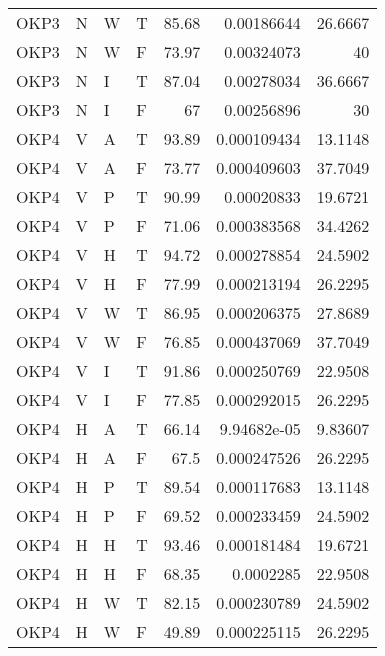 \begin{longtable}{llllrrr}
    OKP3     & N     & W     & T          & 85.68      & 0.00186644  & 26.6667  \\
    OKP3     & N     & W     & F          & 73.97      & 0.00324073  & 40       \\
    OKP3     & N     & I     & T          & 87.04      & 0.00278034  & 36.6667  \\
    OKP3     & N     & I     & F          & 67         & 0.00256896  & 30       \\
    OKP4     & V     & A     & T          & 93.89      & 0.000109434 & 13.1148  \\
    OKP4     & V     & A     & F          & 73.77      & 0.000409603 & 37.7049  \\
    OKP4     & V     & P     & T          & 90.99      & 0.00020833  & 19.6721  \\
    OKP4     & V     & P     & F          & 71.06      & 0.000383568 & 34.4262  \\
    OKP4     & V     & H     & T          & 94.72      & 0.000278854 & 24.5902  \\
    OKP4     & V     & H     & F          & 77.99      & 0.000213194 & 26.2295  \\
    OKP4     & V     & W     & T          & 86.95      & 0.000206375 & 27.8689  \\
    OKP4     & V     & W     & F          & 76.85      & 0.000437069 & 37.7049  \\
    OKP4     & V     & I     & T          & 91.86      & 0.000250769 & 22.9508  \\
    OKP4     & V     & I     & F          & 77.85      & 0.000292015 & 26.2295  \\
    OKP4     & H     & A     & T          & 66.14      & 9.94682e-05 & 9.83607  \\
    OKP4     & H     & A     & F          & 67.5       & 0.000247526 & 26.2295  \\
    OKP4     & H     & P     & T          & 89.54      & 0.000117683 & 13.1148  \\
    OKP4     & H     & P     & F          & 69.52      & 0.000233459 & 24.5902  \\
    OKP4     & H     & H     & T          & 93.46      & 0.000181484 & 19.6721  \\
    OKP4     & H     & H     & F          & 68.35      & 0.0002285   & 22.9508  \\
    OKP4     & H     & W     & T          & 82.15      & 0.000230789 & 24.5902  \\
    OKP4     & H     & W     & F          & 49.89      & 0.000225115 & 26.2295  \\

\end{longtable}
